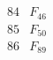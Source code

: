 \documentclass{article}
\begin{document}
{$$\begin{array}{|r|*{7}{r|}}
 & 
 & 
\\
\hline
84 
 & F_{46} &
 & 
 & 
 & 
 & 
 & 
\\
\hline
85 
 & F_{50} &
 & 
 & 
 & 
 & 
 & 
\\
\hline
86 
 & F_{89} &
 & 

\end{array}$$}
\end{document}
